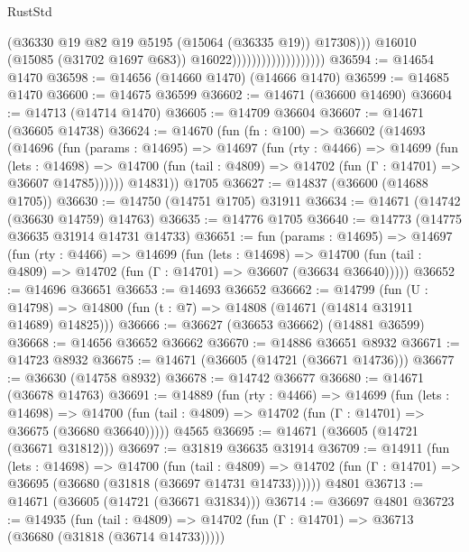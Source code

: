 \begin{lexlean}{RustStd}
\begin{coremodule}
                                              (@36330
                                                @19
                                                @82
                                                @19
                                                @5195
                                                (@15064 (@36335 @19))
                                                @17308)))
                                          @16010
                                          (@15085 (@31702 @1697 @683))
                                          @16022)))))))))))))))))))
@36594 := @14654 @1470
@36598 := @14656 (@14660 @1470) (@14666 @1470)
@36599 := @14685 @1470
@36600 := @14675 @36599
@36602 := @14671 (@36600 @14690)
@36604 := @14713 (@14714 @1470)
@36605 := @14709 @36604
@36607 := @14671 (@36605 @14738)
@36624 := @14670
    (fun (fn : @100) =>
    @36602
      (@14693
        (@14696
          (fun (params : @14695) =>
          @14697
            (fun (rty : @4466) =>
            @14699
              (fun (lets : @14698) =>
              @14700 (fun (tail : @4809) => @14702 (fun (Γ : @14701) => @36607 @14785))))))
        @14831))
    @1705
@36627 := @14837 (@36600 (@14688 @1705))
@36630 := @14750 (@14751 @1705) @31911
@36634 := @14671 (@14742 (@36630 @14759) @14763)
@36635 := @14776 @1705
@36640 := @14773 (@14775 @36635 @31914 @14731 @14733)
@36651 := fun (params : @14695) =>
  @14697
    (fun (rty : @4466) =>
    @14699
      (fun (lets : @14698) =>
      @14700 (fun (tail : @4809) => @14702 (fun (Γ : @14701) => @36607 (@36634 @36640)))))
@36652 := @14696 @36651
@36653 := @14693 @36652
@36662 := @14799
    (fun (U : @14798) => @14800 (fun (t : @7) => @14808 (@14671 (@14814 @31911 @14689) @14825)))
@36666 := @36627 (@36653 @36662) (@14881 @36599)
@36668 := @14656 @36652 @36662
@36670 := @14886 @36651 @8932
@36671 := @14723 @8932
@36675 := @14671 (@36605 (@14721 (@36671 @14736)))
@36677 := @36630 (@14758 @8932)
@36678 := @14742 @36677
@36680 := @14671 (@36678 @14763)
@36691 := @14889
    (fun (rty : @4466) =>
    @14699
      (fun (lets : @14698) =>
      @14700 (fun (tail : @4809) => @14702 (fun (Γ : @14701) => @36675 (@36680 @36640)))))
    @4565
@36695 := @14671 (@36605 (@14721 (@36671 @31812)))
@36697 := @31819 @36635 @31914
@36709 := @14911
    (fun (lets : @14698) =>
    @14700
      (fun (tail : @4809) =>
      @14702 (fun (Γ : @14701) => @36695 (@36680 (@31818 (@36697 @14731 @14733))))))
    @4801
@36713 := @14671 (@36605 (@14721 (@36671 @31834)))
@36714 := @36697 @4801
@36723 := @14935
    (fun (tail : @4809) => @14702 (fun (Γ : @14701) => @36713 (@36680 (@31818 (@36714 @14733)))))

\end{coremodule}
\end{lexlean}
